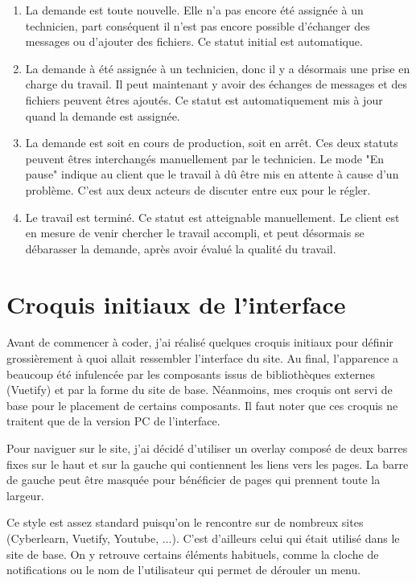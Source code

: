 \documentclass[
    iai, %
    eai, %
]{heig-tb}
\begin{document}
\begin{enumerate}
  \item La demande est toute nouvelle. Elle n'a pas encore été assignée à un technicien, part conséquent il n'est pas encore possible d'échanger des messages ou d'ajouter des fichiers. Ce statut initial est automatique.
  \item La demande à été assignée à un technicien, donc il y a désormais une prise en charge du travail. Il peut maintenant y avoir des échanges de messages et des fichiers peuvent êtres ajoutés. Ce statut est automatiquement mis à jour quand la demande est assignée.
  \item La demande est soit en cours de production, soit en arrêt. Ces deux statuts peuvent êtres interchangés manuellement par le technicien. Le mode "En pause" indique au client que le travail à dû être mis en attente à cause d'un problème. C'est aux deux acteurs de discuter entre eux pour le régler.
  \item Le travail est terminé. Ce statut est atteignable manuellement. Le client est en mesure de venir chercher le travail accompli, et peut désormais se débarasser la demande, après avoir évalué la qualité du travail.
\end{enumerate}
\bigskip

\newpage
\section{Croquis initiaux de l'interface}
Avant de commencer à coder, j'ai réalisé quelques croquis initiaux pour définir grossièrement à quoi allait ressembler l'interface du site.
Au final, l'apparence a beaucoup été infulencée par les composants issus de bibliothèques externes (Vuetify) et par la forme du site de base.
Néanmoins, mes croquis ont servi de base pour le placement de certains composants. Il faut noter que ces croquis ne traitent que de la version PC de l'interface.

Pour naviguer sur le site, j'ai décidé d'utiliser un overlay composé de deux barres fixes sur le haut et sur la gauche qui contiennent les liens vers les pages.
La barre de gauche peut être masquée pour bénéficier de pages qui prennent toute la largeur.


Ce style est assez standard puisqu'on le rencontre sur de nombreux sites (Cyberlearn, Vuetify, Youtube, ...).
C'est d'ailleurs celui qui était utilisé dans le site de base.
On y retrouve certains éléments habituels, comme la cloche de notifications ou le nom de l'utilisateur qui permet de dérouler un menu.
\end{document}
